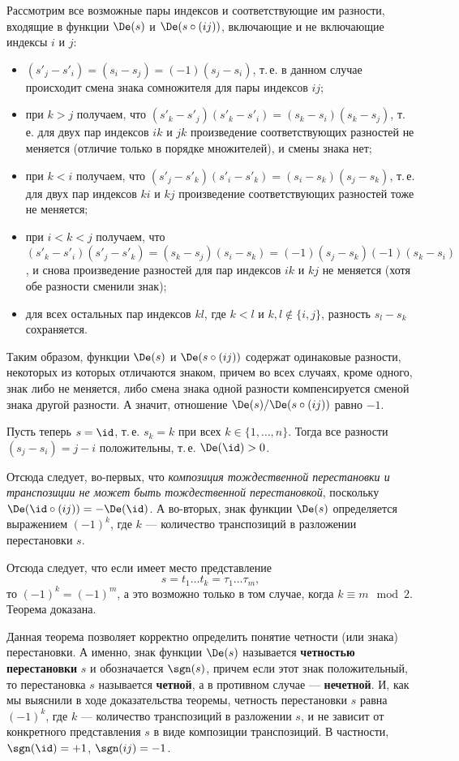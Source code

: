 \begin{enumerate}
Рассмотрим все возможные пары индексов и соответствующие им разности, входящие в функции $\De(s)$ и $\De(s\circ(ij))$, включающие и не включающие индексы $i$ и $j$:
\begin{itemize}
\item $(s'_j-s'_i)=(s_i-s_j)=(-1)(s_j-s_i)$, т.\,е. в данном случае происходит смена знака сомножителя для пары индексов $ij$;
\item при $k>j$ получаем, что $(s'_k-s'_j)(s'_k-s'_i)=(s_k-s_i)(s_k-s_j)$, т.\,е. для двух пар индексов $ik$ и $jk$ произведение соответствующих разностей не меняется (отличие только в порядке множителей), и смены знака нет;
\item при $k<i$ получаем, что $(s'_j-s'_k)(s'_i-s'_k)=(s_i-s_k)(s_j-s_k)$, т.\,е. для двух пар индексов $ki$ и $kj$ произведение соответствующих разностей тоже не меняется;
\item при $i<k<j$ получаем, что $(s'_k-s'_i)(s'_j-s'_k)=(s_k-s_j)(s_i-s_k)=(-1)(s_j-s_k)(-1)(s_k-s_i)$, и снова произведение разностей для пар индексов $ik$ и $kj$ не меняется (хотя обе разности сменили знак);
\item для всех остальных пар индексов $kl$, где $k<l$ и $k,l\notin\{i,j\}$, разность $s_l-s_k$ сохраняется.
\end{itemize}
Таким образом, функции $\De(s)$ и $\De(s\circ(ij))$ содержат одинаковые разности, некоторых из которых отличаются знаком, причем во всех случаях, кроме одного, знак либо не меняется, либо смена знака одной разности компенсируется сменой знака другой разности. А значит, отношение $\De(s)/\De(s\circ(ij))$ равно $-1$.

Пусть теперь $s=\id$, т.\,е. $s_k=k$ при всех $k\in\{1,\dots,n\}$. Тогда все разности $(s_j-s_i)=j-i$ положительны, т.\,е. $\De(\id)>0$.

Отсюда следует, во-первых, что \textit{композиция тождественной перестановки и транспозиции не может быть тождественной перестановкой}, поскольку $\De(\id\circ(ij))=-\De(\id)$. А во-вторых, знак функции $\De(s)$ определяется выражением $(-1)^k$, где $k$ --- количество транспозиций в разложении перестановки $s$.

Отсюда следует, что если имеет место представление
$$
s=t_1\dots t_k=\tau_1\dots\tau_m,
$$
то $(-1)^k=(-1)^m$, а это возможно только в том случае, когда $k\equiv m\mod 2$. Теорема доказана.
\epf

Данная теорема позволяет корректно определить понятие четности (или знака) перестановки. А именно, знак функции $\De(s)$ называется \textbf{четностью перестановки} $s$ и обозначается $\sgn(s)$, причем если этот знак положительный, то перестановка $s$ называется \textbf{четной}, а в противном случае --- \textbf{нечетной}. И, как мы выяснили в ходе доказательства теоремы, четность перестановки $s$ равна $(-1)^k$, где $k$ --- количество транспозиций в разложении $s$, и не зависит от конкретного представления $s$ в виде композиции транспозиций. В частности, $\sgn(\id)=+1$, $\sgn(ij)=-1$. 


\end{enumerate}
